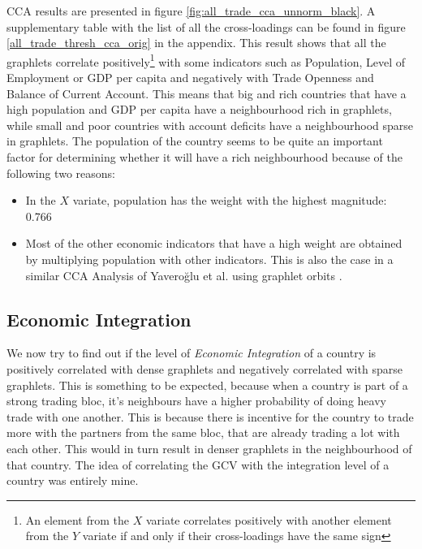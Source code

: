 CCA results are presented in figure \ref{fig:all_trade_cca_unnorm_black}. A supplementary table with the list of all the cross-loadings can be found in figure \ref{all_trade_thresh_cca_orig} in the appendix. This result shows that all the graphlets correlate positively\footnote{An element from the $X$ variate correlates positively with another element from the $Y$ variate if and only if their cross-loadings have the same sign} with some indicators such as Population, Level of Employment or GDP per capita and negatively with Trade Openness and Balance of Current Account. This means that big and rich countries that have a high population and GDP per capita have a neighbourhood rich in graphlets, while small and poor countries with account deficits have a neighbourhood sparse in graphlets. The population of the country seems to be quite an important factor for determining whether it will have a rich neighbourhood because of the following two reasons:
\begin{itemize}
 \item In the $X$ variate, population has the weight with the highest magnitude: 0.766
 \item Most of the other economic indicators that have a high weight are obtained by multiplying population with other indicators. This is also the case in a similar CCA Analysis of Yavero\u{g}lu et al. using graphlet orbits \cite{yaverouglu2014revealing}.
\end{itemize}

\subsection{Economic Integration}
\label{sec:cca_integration}

We now try to find out if the level of \emph{Economic Integration} of a country is positively correlated with dense graphlets and negatively correlated with sparse graphlets. This is something to be expected, because when a country is part of a strong trading bloc, it's neighbours have a higher probability of doing heavy trade with one another. This is because there is incentive for the country to trade more with the partners from the same bloc, that are already trading a lot with each other. This would in turn result in denser graphlets in the neighbourhood of that country. The idea of correlating the GCV with the integration level of a country was entirely mine.

